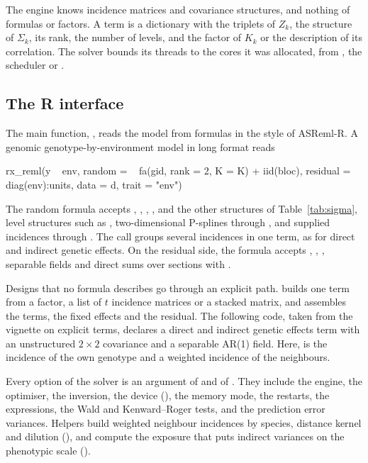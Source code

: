 \documentclass[article,nojss]{jss}
\renewcommand{\pkg}[1]{#1}
\begin{document}
The engine knows incidence matrices and covariance structures, and nothing of
formulas or factors. A term is a dictionary with the triplets of $Z_k$, the
structure of $\Sigma_k$, its rank, the number of levels, and the factor of
$K_k$ or the description of its correlation. The solver bounds its threads to
the cores it was allocated, from , the scheduler or
.

\subsection{The R interface}

The main function, , reads the model from formulas in the
style of \pkg{ASReml-R}. A genomic genotype-by-environment model in long
format reads
\begin{Code}
rx_reml(y ~ env, random = ~ fa(gid, rank = 2, K = K) + iid(bloc),
        residual = ~ diag(env):units, data = d, trait = "env")
\end{Code}
The random formula accepts , , ,
,  and the other structures of Table~\ref{tab:sigma},
level structures such as , two-dimensional P-splines
through  \citep{rodriguez2018}, and supplied incidences through
. The call  groups several
incidences in one term, as for direct and indirect genetic effects. On the
residual side, the formula accepts , ,
, separable fields and direct sums over sections with
.

Designs that no formula describes go through an explicit path.
 builds one term from a factor, a list of $t$ incidence
matrices or a stacked matrix, and  assembles the terms, the
fixed effects and the residual. The following code, taken from the vignette on
explicit terms, declares a direct and indirect genetic effects term with an
unstructured $2 \times 2$ covariance and a separable AR(1) field. Here,
 is the incidence of the own genotype and  a weighted
incidence of the neighbours.
Every option of the solver is an argument of  and of
. They include the engine, the optimiser, the inversion, the
device (), the memory mode, the restarts, the 
expressions, the Wald and Kenward--Roger tests, and the prediction error
variances. Helpers build weighted neighbour incidences by species, distance
kernel and dilution (), and compute the exposure that
puts indirect variances on the phenotypic scale ().
\end{document}
